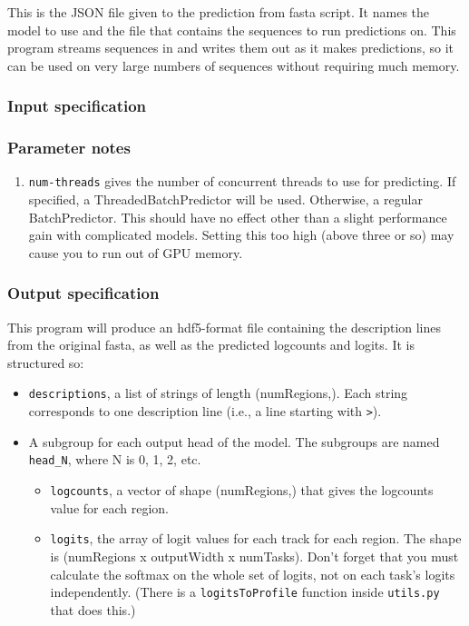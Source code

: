 \documentclass{article}
\begin{document}
This is the JSON file given to the prediction from fasta script.
It names the model to use and the file that contains the sequences to run
predictions on.
This program streams sequences in and writes them out as it makes predictions,
so it can be used on very large numbers of sequences without requiring much
memory.

\subsubsection{Input specification}



\subsubsection{Parameter notes}

\begin{enumerate}
    \item \texttt{num-threads} gives the number of concurrent threads to use for
        predicting. If specified, a ThreadedBatchPredictor will be used. Otherwise, a
        regular BatchPredictor. This should have no effect other than a slight performance
        gain with complicated models. Setting this too high (above three or so) may cause
        you to run out of GPU memory.
\end{enumerate}


\subsubsection{Output specification}

This program will produce an hdf5-format file containing the description lines
from the original fasta, as well as the predicted logcounts and logits.
It is structured so:

\begin{itemize}
    \item \texttt{descriptions}, a list of strings of length (numRegions,).
        Each string corresponds to one description line (i.e., a line starting
        with \texttt{>}).
    \item A subgroup for each output head of the model.
        The subgroups are named \texttt{head\_N}, where N is 0, 1, 2, etc.
        \begin{itemize}
            \item \texttt{logcounts}, a vector of shape (numRegions,) that gives
                the logcounts value for each region.
            \item \texttt{logits}, the array of logit values for each track for
                each region.
                The shape is (numRegions x outputWidth x numTasks).
                Don't forget that you must calculate the softmax on the whole
                set of logits, not on each task's logits independently.
                (There is a \texttt{logitsToProfile} function inside
                \texttt{utils.py} that does this.)
        \end{itemize}
\end{itemize}
\end{document}
